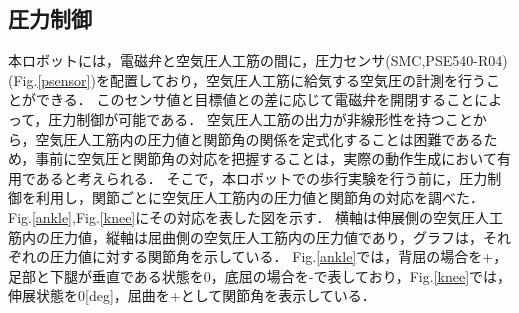 \subsection{圧力制御}
本ロボットには，電磁弁と空気圧人工筋の間に，圧力センサ(SMC,PSE540-R04)(Fig.\ref{psensor})を配置しており，空気圧人工筋に給気する空気圧の計測を行うことができる．
このセンサ値と目標値との差に応じて電磁弁を開閉することによって，圧力制御が可能である．
空気圧人工筋の出力が非線形性を持つことから，空気圧人工筋内の圧力値と関節角の関係を定式化することは困難であるため，事前に空気圧と関節角の対応を把握することは，実際の動作生成において有用であると考えられる．
そこで，本ロボットでの歩行実験を行う前に，圧力制御を利用し，関節ごとに空気圧人工筋内の圧力値と関節角の対応を調べた．
Fig.\ref{ankle},Fig.\ref{knee}にその対応を表した図を示す．
横軸は伸展側の空気圧人工筋内の圧力値，縦軸は屈曲側の空気圧人工筋内の圧力値であり，グラフは，それぞれの圧力値に対する関節角を示している．
Fig.\ref{ankle}では，背屈の場合を+，足部と下腿が垂直である状態を0，底屈の場合を-で表しており，Fig.\ref{knee}では，伸展状態を0[deg]，屈曲を+として関節角を表示している．

